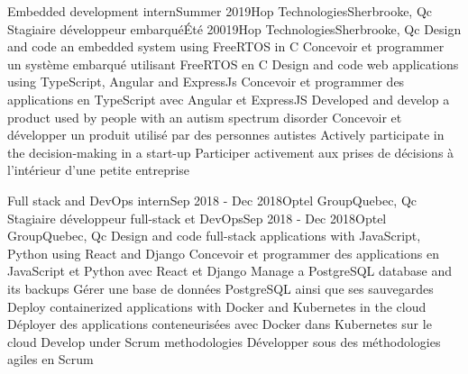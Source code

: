     \resumeSubheadingEnFr
      {Embedded development intern}{Summer 2019}{Hop Technologies}{Sherbrooke, Qc}
      {Stagiaire développeur embarqué}{Été 20019}{Hop Technologies}{Sherbrooke, Qc}
            \resumeItemListStart
                \resumeItemEnFr
                    {Design and code an embedded system using FreeRTOS in C}
                    {Concevoir et programmer un système embarqué utilisant FreeRTOS en C}
                \resumeItemEnFr
                    {Design and code web applications using TypeScript, Angular and ExpressJs}
                    {Concevoir et programmer des applications en TypeScript avec Angular et ExpressJS}
                \resumeItemEnFr
                    {Developed and develop a product used by people with an autism spectrum disorder}
                    {Concevoir et développer un produit utilisé par des personnes autistes}
                \resumeItemEnFr
                    {Actively participate in the decision-making in a start-up}
                    {Participer activement aux prises de décisions à l’intérieur d’une petite entreprise}
            \resumeItemListEnd

    \resumeSubheadingEnFr
      {Full stack and DevOps intern}{Sep 2018 - Dec 2018}{Optel Group}{Quebec, Qc}
      {Stagiaire développeur full-stack et DevOps}{Sep 2018 - Dec 2018}{Optel Group}{Quebec, Qc}
            \resumeItemListStart
                \resumeItemEnFr
                    {Design and code full-stack applications with JavaScript, Python using React and Django}
                    {Concevoir et programmer des applications en JavaScript et Python avec React et Django}
                \resumeItemEnFr
                    {Manage a PostgreSQL database and its backups}
                    {Gérer une base de données PostgreSQL ainsi que ses sauvegardes}
                \resumeItemEnFr
                    {Deploy containerized applications with Docker and Kubernetes in the cloud}
                    {Déployer des applications conteneurisées avec Docker dans Kubernetes sur le cloud}
                \resumeItemEnFr
                    {Develop under Scrum methodologies}
                    {Développer sous des méthodologies agiles en Scrum}
            \resumeItemListEnd
    \resumeSubHeadingListEnd


